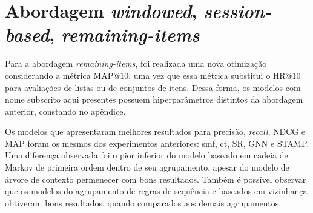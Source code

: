 \section{Abordagem \textit{windowed}, \textit{session-based}, \textit{remaining-items}}
Para a abordagem \textit{remaining-items}, foi realizada uma nova otimização
considerando a métrica MAP@10, uma vez que essa métrica substitui o HR@10 para
avaliações de listas ou de conjuntos de itens. Dessa forma, os modelos com nome subscrito aqui presentes possuem hiperparâmetros
distintos da abordagem anterior, constando no apêndice.

Os modelos que apresentaram melhores resultados para precisão, \textit{recall},
NDCG e MAP foram os mesmos dos experimentos anteriores: smf, ct, SR, GNN e
STAMP. Uma diferença observada foi o pior inferior do modelo baseado em cadeia
de Markov de primeira ordem dentro de seu agrupamento, apesar do modelo de árvore de contexto permenecer
com bons resultados. Também é possível observar que os modelos do agrupamento
de regras de sequência e baseados em vizinhança obtiveram bons resultados, quando
comparados aos demais agrupamentos.


